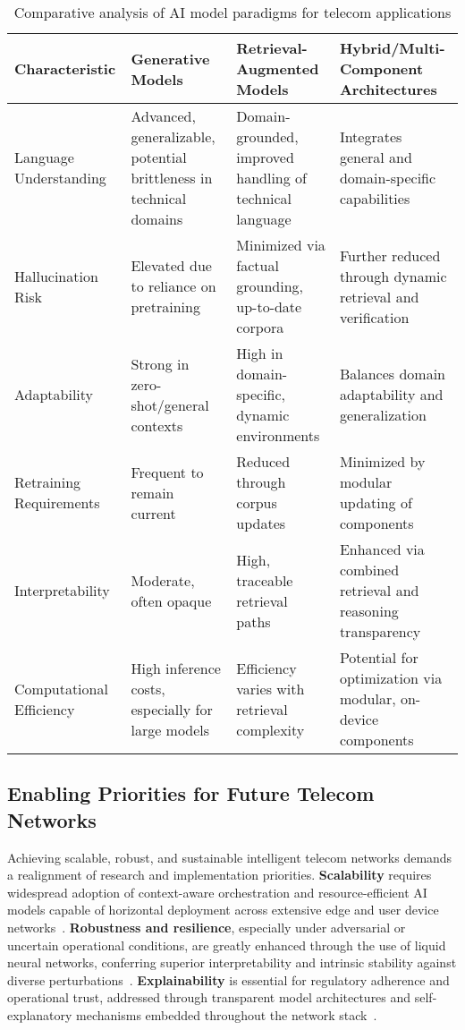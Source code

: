 \begin{table*}[htbp]
\centering
\caption{Comparative analysis of AI model paradigms for telecom applications}
\label{tab:model_comparison}
\begin{adjustbox}{max width=\textwidth}
\begin{tabular}{llll}
\toprule
\textbf{Characteristic} & \textbf{Generative Models} & \textbf{Retrieval-Augmented Models} & \textbf{Hybrid/Multi-Component Architectures} \\
\midrule
Language Understanding & Advanced, generalizable, potential brittleness in technical domains & Domain-grounded, improved handling of technical language & Integrates general and domain-specific capabilities \\
Hallucination Risk & Elevated due to reliance on pretraining & Minimized via factual grounding, up-to-date corpora & Further reduced through dynamic retrieval and verification \\
Adaptability & Strong in zero-shot/general contexts & High in domain-specific, dynamic environments & Balances domain adaptability and generalization \\
Retraining Requirements & Frequent to remain current & Reduced through corpus updates & Minimized by modular updating of components \\
Interpretability & Moderate, often opaque & High, traceable retrieval paths & Enhanced via combined retrieval and reasoning transparency \\
Computational Efficiency & High inference costs, especially for large models & Efficiency varies with retrieval complexity & Potential for optimization via modular, on-device components \\
\bottomrule
\end{tabular}
\end{adjustbox}
\end{table*}

\subsection{Enabling Priorities for Future Telecom Networks}

Achieving scalable, robust, and sustainable intelligent telecom networks demands a realignment of research and implementation priorities. \textbf{Scalability} requires widespread adoption of context-aware orchestration and resource-efficient AI models capable of horizontal deployment across extensive edge and user device networks~\cite{ref15,ref17,ref19}. \textbf{Robustness and resilience}, especially under adversarial or uncertain operational conditions, are greatly enhanced through the use of liquid neural networks, conferring superior interpretability and intrinsic stability against diverse perturbations~\cite{ref19}. \textbf{Explainability} is essential for regulatory adherence and operational trust, addressed through transparent model architectures and self-explanatory mechanisms embedded throughout the network stack~\cite{ref19,ref21,ref22,ref23}.

